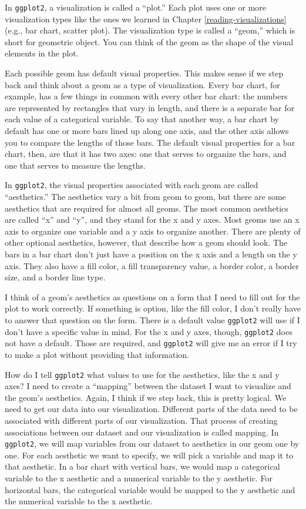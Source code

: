 \documentclass[
]{krantz}
\begin{document}
In \texttt{ggplot2},
a visualization is called a ``plot.'' Each plot uses one or more visualization types
like the ones we learned in Chapter \ref{reading-visualizations} (e.g., bar
chart, scatter plot). The visualization type is called a ``geom,'' which is short
for geometric object. You can think of the geom as the shape of the visual elements
in the plot.

Each possible geom has default visual properties. This makes sense if we step back
and think about a geom as a type of visualization. Every bar chart, for example,
has a few things in common with every other bar chart: the numbers are represented
by rectangles that vary in length, and there is a separate bar for each value of
a categorical variable. To say that another way, a bar chart by default has one
or more bars lined up along one axis, and the other axis allows you to compare
the lengths of those bars. The default visual properties for a bar chart, then,
are that it has two axes: one that serves to organize the bars, and one that
serves to measure the lengths.

In \texttt{ggplot2}, the visual properties associated with each geom are called ``aesthetics.''
The aesthetics vary a bit from geom to geom, but there are some aesthetics that
are required for almost all geoms. The most common aesthetics are called ``x'' and ``y'',
and they stand for the x and y axes. Most geoms use an x axis to organize
one variable and a y axis to organize another. There are plenty of other optional
aesthetics, however, that describe how a geom should look. The bars
in a bar chart don't just have a position on the x axis and a length on the y axis.
They also have a fill color, a fill transparency value, a border color, a border
size, and a border line type.

I think of a geom's aesthetics as questions on a form that I need to fill out for the
plot to work correctly. If something is option, like the fill color, I don't really
have to answer that question on the form. There is a default value \texttt{ggplot2} will
use if I don't have a specific value in mind. For the x and y axes, though, \texttt{ggplot2}
does not have a default. Those are required, and \texttt{ggplot2} will give me an error
if I try to make a plot without providing that information.

How do I tell \texttt{ggplot2} what values to use for the aesthetics, like the x and y
axes? I need to create a ``mapping'' between the dataset I want to visualize and the
geom's aesthetics. Again, I think if we step back, this is pretty logical. We need
to get our data into our visualization. Different parts of the data need to be
associated with different parts of our visualization. That process of creating
associations between our dataset and our visualization is called mapping. In \texttt{ggplot2},
we will map variables from our dataset to aesthetics in our geom one by one. For
each aesthetic we want to specify, we will pick a variable and map it to that
aesthetic. In a bar chart with vertical bars, we would map a categorical variable
to the x aesthetic and a numerical variable to the y aesthetic. For horizontal bars,
the categorical variable would be mapped to the y aesthetic and the numerical
variable to the x aesthetic.
\end{document}
